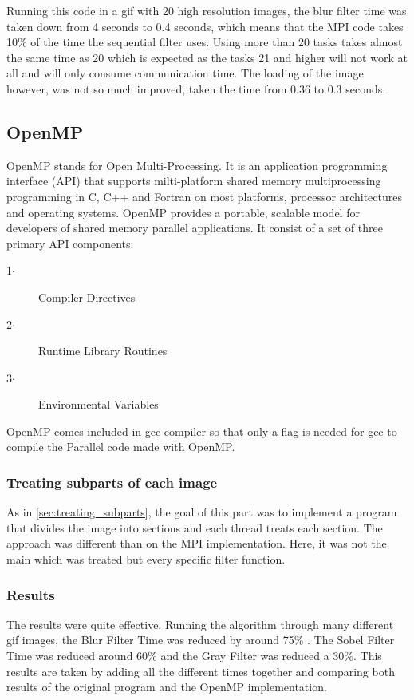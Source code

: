 \documentclass[conference,compsoc]{IEEEtran}
\begin{document}
Running this code in a gif with 20 high resolution images, the blur filter time was taken down from 4 seconds to 0.4 seconds, which means that the MPI code takes 10\% of the time the sequential filter uses. Using more than 20 tasks takes almost the same time as 20 which is expected as the tasks 21 and higher will not work at all and will only consume communication time.
The loading of the image however, was not so much improved, taken the time from 0.36 to 0.3 seconds.



\subsection{OpenMP} \label{sec:OpenMP}
OpenMP stands for Open Multi-Processing. It is an application programming interface (API) that supports milti-platform shared memory multiprocessing programming in C, C++ and Fortran on most platforms, processor architectures and operating systems.
OpenMP provides a portable, scalable model for developers of shared memory parallel applications.
It consist of a set of three primary API components:
\begin{description}
	\item[1$\cdot$] Compiler Directives
	\item[2$\cdot$] Runtime Library Routines
	\item[3$\cdot$] Environmental Variables
\end{description}

OpenMP comes included in gcc compiler so that only a flag is needed for gcc to compile the Parallel code made with OpenMP.

\subsubsection{Treating subparts of each image}
As in \ref{sec:treating_subparts}, the goal of this part was to implement a program that divides the image into sections and each thread treats each section. The approach was different than on the MPI implementation. Here, it was not the main which was treated but every specific filter function.

\subsubsection{Results} \label{sec:results}
The results were quite effective. Running the algorithm through many different gif images, the Blur Filter Time was reduced by around 75\% . The Sobel Filter Time was reduced around 60\% and the Gray Filter was reduced a 30\%. This results are taken by adding all the different times together and comparing both results of the original program and the OpenMP implementation.
\end{document}
